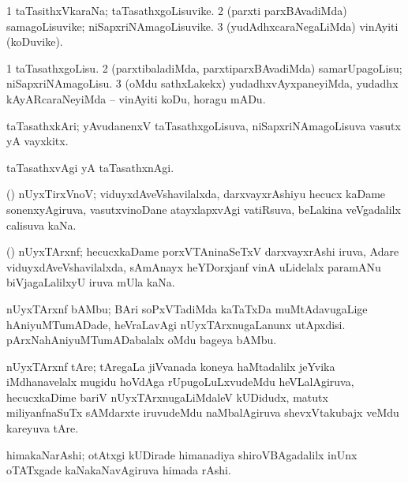 \bentry
{}
\gl{\nA}
\bmng
\bnum
\num{1} taTasithxVkaraNa; taTasathxgoLisuvike. 
\num{2} (parxti parxBAvadiMda) samagoLisuvike; niSapxriNAmagoLisuvike. 
\num{3} (yudAdhxcaraNegaLiMda) vinAyiti (koDuvike). 
\enum
\emng
\eentry

\bentry
{}
\gl{\sakirx}
\bmng
\bnum
\num{1} taTasathxgoLisu. 
\num{2} (parxtibaladiMda, parxtiparxBAvadiMda) samarUpagoLisu; niSapxriNAmagoLisu. 
\num{3} (oMdu sathxLakekx) yudadhxvAyxpaneyiMda, yudadhx kAyARcaraNeyiMda -- vinAyiti koDu, horagu mADu. 
\enum
\emng
\eentry

\bentry
{}
\gl{\nA}
\bmng
 taTasathxkAri; yAvudanenxV taTasathxgoLisuva, niSapxriNAmagoLisuva vasutx yA vayxkitx. 
\emng
\eentry

\bentry
{}
\gl{\kirxvi}
\bmng
taTasathxvAgi yA taTasathxnAgi. 
\emng
\eentry

\bentry
{}
\gl{\nA}
\bmng
 (\Bwvi) nUyxTirxVnoV; viduyxdAveVshavilalxda, darxvayxrAshiyu hecucx kaDame sonenxyAgiruva, vasutxvinoDane atayxlapxvAgi vatiRsuva, beLakina veVgadalilx calisuva kaNa. 
\emng
\eentry

\bentry
{}
\gl{\nA}
\bmng
(\Bwvi) nUyxTArxnf; hecucxkaDame porxVTAninaSeTxV darxvayxrAshi iruva, Adare viduyxdAveVshavilalxda, sAmAnayx heYDorxjanf vinA uLidelalx paramANu biVjagaLalilxyU iruva mUla kaNa. 
\emng
\eentry

\bentry
{}
\gl{\nA}
\bmng
nUyxTArxnf bAMbu; BAri soPxVTadiMda kaTaTxDa muMtAdavugaLige hAniyuMTumADade, heVraLavAgi nUyxTArxnugaLanunx utApxdisi. pArxNahAniyuMTumADabalalx oMdu bageya bAMbu. 
\emng
\eentry

\bentry
{}
\gl{\nA}
\bmng
nUyxTArxnf tAre; tAregaLa jiVvanada koneya haMtadalilx jeYvika iMdhanavelalx mugidu hoVdAga rUpugoLuLxvudeMdu heVLalAgiruva, hecucxkaDime bariV nUyxTArxnugaLiMdaleV kUDidudx, matutx miliyanfnaSuTx sAMdarxte iruvudeMdu naMbalAgiruva shevxVtakubajx veMdu kareyuva tAre. 
\emng
\eentry

\bentry
{}
\gl{\saMkiSx}
\bmng
\emng
\eentry

\bentry
{}
\gl{\nA}
\bmng
himakaNarAshi; otAtxgi kUDirade himanadiya shiroVBAgadalilx inUnx oTATxgade kaNakaNavAgiruva himada rAshi. 
\emng
\eentry

